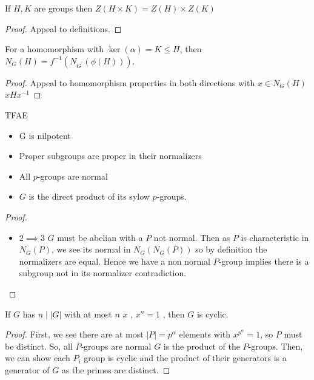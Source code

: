 \begin{remark}
	If \(H, K\) are groups then \(Z\left( H \times K \right)  = Z\left( H \right) \times Z\left( K \right) \)
\end{remark}
\begin{proof}
	Appeal to definitions.
\end{proof}
\begin{theorem}
	For a homomorphism with \(\ker \left( \alpha \right)  = K \le H\), then \(N_{G}\left( H \right)  = f^{-1}\left( N_{G^{\prime}}\left( \phi\left( H \right)  \right)  \right) \).
\end{theorem}
\begin{proof}
	Appeal to homomorphism properties in both directions with \(x \in N_{G}\left( H \right) \) \(xHx^{-1}\)
\end{proof}
\begin{theorem}
	TFAE
	\begin{itemize}
		\item G is nilpotent
		\item Proper subgroups are proper in their normalizers
			\item All \(p\)-groups are normal
				\item \(G\) is the direct product of its sylow \(p\)-groups.
	\end{itemize}
\end{theorem}
\begin{proof}
	\begin{itemize}
		\item \(2\implies 3\) \(G\) must be abelian with a \(P\) not normal. Then as \(P\) is characteristic in \(N_{G}\left( P \right) \), we see its normal in \(N_{G}\left( N_{G}\left( P \right)  \right) \) so by definition the normalizers are equal. Hence we have a non normal \(P\)-group implies there is a subgroup not in its normalizer contradiction.
	\end{itemize}
\end{proof}
\begin{theorem}
If \(G\) has \(n \mid \left| G \right| \) with at most \(n\) \(x\) , \(x^{n}= 1\) , then \(G\) is cyclic.
\end{theorem}
\begin{proof}
	First, we see there are at most \(\left| P \right| = p^{\alpha}\) elements with \(x^{p^{\alpha}}=1\), so \(P\) must be distinct. So, all \(P\)-groups are normal \(G\) is the product of the \(P\)-groups. Then, we can show each \(P_{i}\) group is cyclic and the product of their generators is a generator of \(G\) as the primes are distinct.
\end{proof}

